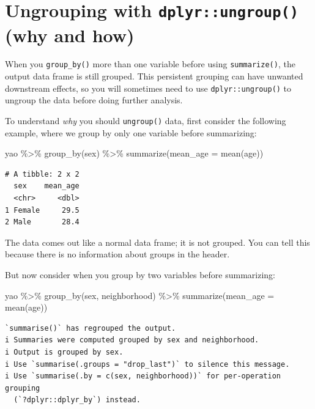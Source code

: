 \documentclass[
  letterpaper,
  DIV=11,
  numbers=noendperiod]{scrreprt}
\newenvironment{Shaded}{\begin{snugshade}}{\end{snugshade}}
\newcommand{\AttributeTok}[1]{\textcolor[rgb]{0.40,0.45,0.13}{#1}}
\newcommand{\FunctionTok}[1]{\textcolor[rgb]{0.28,0.35,0.67}{#1}}
\newcommand{\NormalTok}[1]{\textcolor[rgb]{0.00,0.23,0.31}{#1}}
\newcommand{\SpecialCharTok}[1]{\textcolor[rgb]{0.37,0.37,0.37}{#1}}
\begin{document}
\section{\texorpdfstring{Ungrouping with \texttt{dplyr::ungroup()} (why
and
how)}{Ungrouping with dplyr::ungroup() (why and how)}}\label{ungrouping-with-dplyrungroup-why-and-how}

When you \texttt{group\_by()} more than one variable before using
\texttt{summarize()}, the output data frame is still grouped. This
persistent grouping can have unwanted downstream effects, so you will
sometimes need to use \texttt{dplyr::ungroup()} to ungroup the data
before doing further analysis.

To understand \emph{why} you should \texttt{ungroup()} data, first
consider the following example, where we group by only one variable
before summarizing:

\begin{Shaded}
\begin{Highlighting}[]
\NormalTok{yao }\SpecialCharTok{\%\textgreater{}\%} 
  \FunctionTok{group\_by}\NormalTok{(sex) }\SpecialCharTok{\%\textgreater{}\%} 
  \FunctionTok{summarize}\NormalTok{(}\AttributeTok{mean\_age =} \FunctionTok{mean}\NormalTok{(age))}
\end{Highlighting}
\end{Shaded}

\begin{verbatim}
# A tibble: 2 x 2
  sex    mean_age
  <chr>     <dbl>
1 Female     29.5
2 Male       28.4
\end{verbatim}

The data comes out like a normal data frame; it is not grouped. You can
tell this because there is no information about groups in the header.

But now consider when you group by two variables before summarizing:

\begin{Shaded}
\begin{Highlighting}[]
\NormalTok{yao }\SpecialCharTok{\%\textgreater{}\%} 
  \FunctionTok{group\_by}\NormalTok{(sex, neighborhood) }\SpecialCharTok{\%\textgreater{}\%} 
  \FunctionTok{summarize}\NormalTok{(}\AttributeTok{mean\_age =} \FunctionTok{mean}\NormalTok{(age))}
\end{Highlighting}
\end{Shaded}

\begin{verbatim}
`summarise()` has regrouped the output.
i Summaries were computed grouped by sex and neighborhood.
i Output is grouped by sex.
i Use `summarise(.groups = "drop_last")` to silence this message.
i Use `summarise(.by = c(sex, neighborhood))` for per-operation grouping
  (`?dplyr::dplyr_by`) instead.
\end{verbatim}
\end{document}
